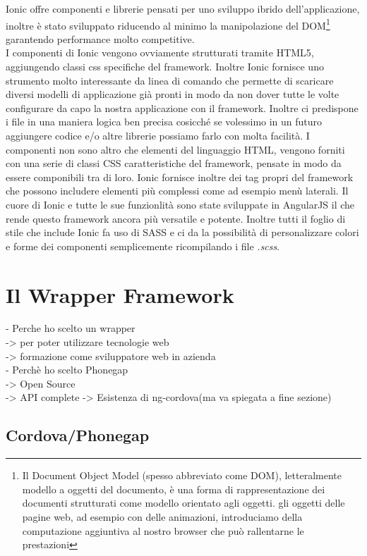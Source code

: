 Ionic offre componenti e librerie pensati per uno sviluppo ibrido dell'applicazione, inoltre è stato sviluppato riducendo al minimo la manipolazione del DOM\footnote{Il Document Object Model (spesso abbreviato come DOM), letteralmente modello a oggetti del documento, è una forma di rappresentazione dei documenti strutturati come modello orientato agli oggetti.\cite{wiki:dom} gli oggetti delle pagine web, ad esempio con delle animazioni, introduciamo della computazione aggiuntiva al nostro browser che può rallentarne le prestazioni} garantendo performance molto competitive.\\
I componenti di Ionic vengono ovviamente strutturati tramite HTML5, aggiungendo classi css specifiche del framework. Inoltre 
Ionic fornisce uno strumento molto interessante da linea di comando che permette di scaricare diversi modelli di applicazione già pronti in modo da non dover tutte le volte configurare da capo la nostra applicazione con il framework. Inoltre ci predispone i file in una maniera logica ben precisa cosicché se volessimo in un futuro aggiungere codice e/o altre librerie possiamo farlo con molta facilità.
I componenti non sono altro che elementi del linguaggio HTML, vengono forniti con una serie di classi CSS caratteristiche del framework, pensate in modo da essere componibili tra di loro. Ionic fornisce inoltre dei tag propri del framework che possono includere elementi più complessi come ad esempio menù laterali.
Il cuore di Ionic e tutte le sue funzionlità sono state sviluppate in AngularJS il che rende questo framework ancora più versatile e potente. Inoltre tutti il foglio di stile che include Ionic fa uso di SASS e ci da la possibilità di personalizzare colori e forme dei componenti semplicemente ricompilando i file \emph{.scss}.
\section{Il Wrapper Framework}

- Perche ho scelto un wrapper \\
	-> per poter utilizzare tecnologie web\\
	-> formazione come sviluppatore web in azienda\\
- Perchè ho scelto Phonegap \\
	-> Open Source\\
	-> API complete
	-> Esistenza di ng-cordova(ma va spiegata a fine sezione)

\subsection{Cordova/Phonegap}

